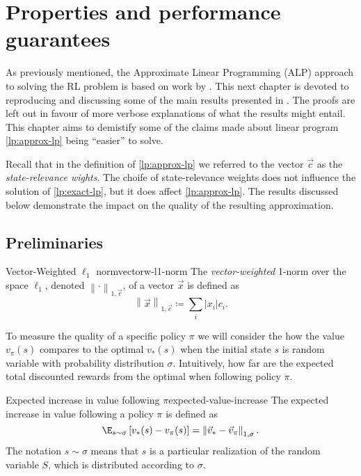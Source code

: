 \chapter{Properties and performance guarantees}
\label{chapter:PropertiesGuarantees}

As previously mentioned, the Approximate Linear Programming (ALP) approach to
solving the RL problem is based on work by \citeauthor{farias2003LP2ADP}. This
next chapter is devoted to reproducing and discussing some of the main results
presented in \cite{farias2003LP2ADP}. The proofs are left out in favour of more
verbose explanations of what the results might entail. This chapter aims to
demistify some of the claims made about linear program \eqref{lp:approx-lp}
being ``easier'' to solve.

Recall that in the definition of \eqref{lp:approx-lp} we referred to the vector
$\vec{c}$ as the \emph{state-relevance wights}. The choife of state-relevance
weights does not influence the solution of \eqref{lp:exact-lp}, but it does
affect \eqref{lp:approx-lp}. The results discussed below demonstrate the impact
on the quality of the resulting approximation.

\section{Preliminaries}

\begin{dfn}{Vector-Weighted $\ell_1$ norm}{vectorw-l1-norm}
    The \emph{vector-weighted} 1-norm over the space $\ell_1$, denoted $\left\| \cdot \right\|_{1, \vec{c}}$, of a vector $\vec{x}$ is defined as
    \[
        \left\| \vec{x} \right\|_{1, \vec{c}} \coloneqq  \sum_i |x_i| c_i.
    \]
\end{dfn}

To measure the quality of a specific policy $\pi$ we will consider the how the
value $v_\pi(s)$ compares to the optimal $v_* (s)$ when the initial state $s$ is
random variable with probability distribution $\sigma$. Intuitively, how far are
the expected total discounted rewards from the optimal when following policy
$\pi$.

\begin{dfn}{Expected increase in value following $\pi$}{expected-value-increase}
    The expected increase in value following a policy $\pi$ is defined as
    \begin{equation}
        \label{eq:expected-value-increase}
        \E_{s \sim \sigma} \left[ v_* (s) - v_\pi (s) \right] = \left\| \vec{v
        }_* - \vec{v}_\pi \right\|_{1, \sigma}.
    \end{equation}
    The notation $s \sim \sigma$ means that $s$ is a particular realization of the
    random variable $S$, which is distributed according to $\sigma$.
\end{dfn}

